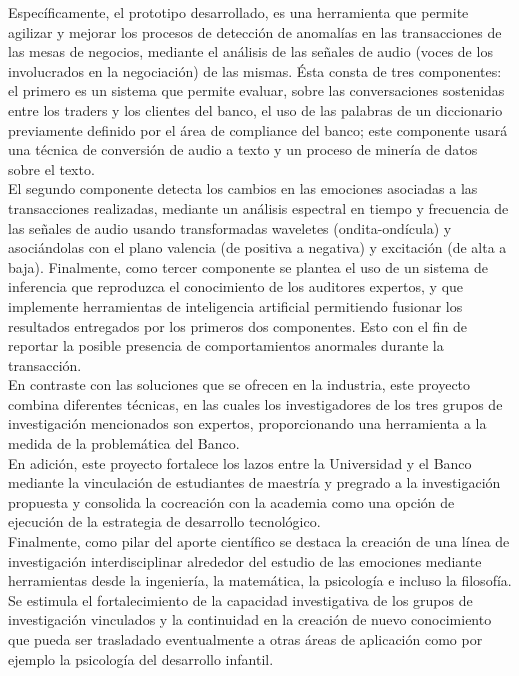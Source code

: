 \documentclass[11pt,lettersize]{article} %
\begin{document}
Específicamente, el prototipo desarrollado, es una herramienta que permite agilizar y mejorar los procesos de detección de anomalías en las transacciones de las mesas de negocios, mediante el análisis de las señales de audio (voces de los involucrados en la negociación) de las mismas. Ésta consta de tres componentes: el primero es un sistema que permite evaluar, sobre las conversaciones sostenidas entre los traders y los clientes del banco, el uso de las palabras de un diccionario previamente definido por el área de compliance del banco; este componente usará una técnica de conversión de audio a texto y un proceso de minería de datos sobre el texto.\\

El segundo componente detecta los cambios en las emociones asociadas a las transacciones realizadas, mediante un análisis espectral en tiempo y frecuencia de las señales de audio usando transformadas waveletes (ondita-ondícula) y asociándolas con el plano valencia (de positiva a negativa) y excitación (de alta a baja). Finalmente, como tercer componente se plantea el uso de un sistema de inferencia que reproduzca el conocimiento de los auditores expertos, y que implemente herramientas de inteligencia artificial permitiendo fusionar los resultados entregados por los primeros dos componentes. Esto con el fin de reportar la posible presencia de comportamientos anormales durante la transacción.\\
%
En contraste con las soluciones que se ofrecen en la industria, este proyecto combina diferentes técnicas, en las cuales los investigadores de los tres grupos de investigación mencionados son expertos, proporcionando una herramienta a la medida de la problemática del Banco.\\

En adición, este proyecto fortalece los lazos entre la Universidad y el Banco mediante la vinculación de estudiantes de maestría y pregrado a la investigación propuesta y consolida la cocreación con la academia como una opción de ejecución de la estrategia de desarrollo tecnológico.\\

Finalmente, como pilar del aporte científico se destaca la creación de una línea de investigación interdisciplinar alrededor del estudio de las emociones mediante herramientas desde la ingeniería, la matemática, la psicología e incluso la filosofía. Se estimula el fortalecimiento de la capacidad investigativa de los grupos de investigación vinculados y la continuidad en la creación de nuevo conocimiento que pueda ser trasladado eventualmente a otras áreas de aplicación como por ejemplo la psicología del desarrollo infantil.\\
\end{document}
